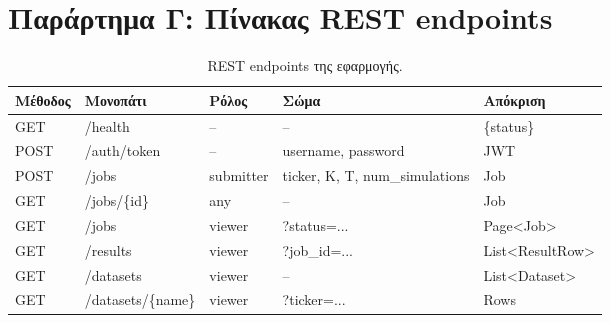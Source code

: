 \documentclass[12pt]{article}
\begin{document}
\section{Παράρτημα Γ: Πίνακας REST endpoints}
\begin{table}[H]
\centering
\small
\begin{tabular}{lllll}
\hline
Μέθοδος & Μονοπάτι & Ρόλος & Σώμα & Απόκριση \\ \hline
GET  & /health           & --        & --                              & \{status\} \\
POST & /auth/token       & --        & username, password              & JWT \\
POST & /jobs             & submitter & ticker, K, T, num\_simulations  & Job \\
GET  & /jobs/\{id\}      & any       & --                              & Job \\
GET  & /jobs             & viewer    & ?status=...                     & Page<Job> \\
GET  & /results          & viewer    & ?job\_id=...                    & List<ResultRow> \\
GET  & /datasets         & viewer    & --                              & List<Dataset> \\
GET  & /datasets/\{name\}& viewer    & ?ticker=...                     & Rows \\ \hline
\end{tabular}
\caption{REST endpoints της εφαρμογής.}
\label{tab:endpoints}
\end{table}
\end{document}
